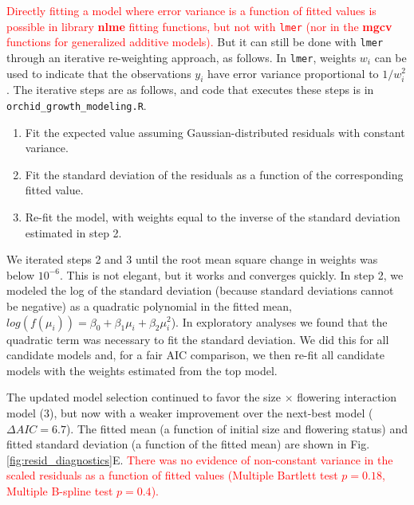 \documentclass[12pt]{article}
\newcommand{\new}{\textcolor{red}}
\begin{document}
\new{Directly fitting a model where error variance is a function of fitted values is possible in library \textbf{nlme} fitting functions, but not with \texttt{lmer} (nor 
in the \textbf{mgcv} functions for generalized additive models). }
But it can still be done with \texttt{lmer} through an iterative re-weighting approach, as follows. 
In \texttt{lmer}, weights $w_{i}$ can be used to indicate that the observations $y_{i}$ have error variance proportional to $1/w_i^2$. 
The iterative steps are as follows, and code that executes these steps is in \texttt{orchid\_growth\_modeling.R}. 
\begin{enumerate}
	\item Fit the expected value assuming Gaussian-distributed residuals with constant variance. 
	\item Fit the standard deviation of the residuals as a function of the corresponding fitted value. 
	\item Re-fit the model, with weights equal to the inverse of the standard deviation estimated in step 2. 
\end{enumerate}
We iterated steps 2 and 3 until the root mean square change in weights was below $10^{-6}$. This is not elegant, but it works and converges quickly. 
In step 2, we modeled the log of the standard deviation (because standard deviations cannot be negative) as a quadratic polynomial in the fitted mean, $log(f(\mu_{i}))=\beta_{0}+\beta_{1}\mu_{i}+\beta_{2}\mu_{i}^2$).  In exploratory analyses we found that the quadratic term was necessary to fit the standard deviation. 
We did this for all candidate models and, for a fair AIC comparison, we then re-fit all candidate models with the weights estimated from the top model. 

The updated model selection continued to favor the size $\times$ flowering interaction model (3), but now with a weaker improvement over the next-best model ($\Delta AIC = 6.7$). 
The fitted mean (a function of initial size and flowering status) and fitted standard deviation (a function of the fitted mean) are shown in Fig. \ref{fig:resid_diagnostics}E. 
\new{There was no evidence of non-constant variance in the scaled residuals as a function of fitted values (Multiple Bartlett test $p=0.18$, Multiple B-spline test $p=0.4$).}  
\end{document}
